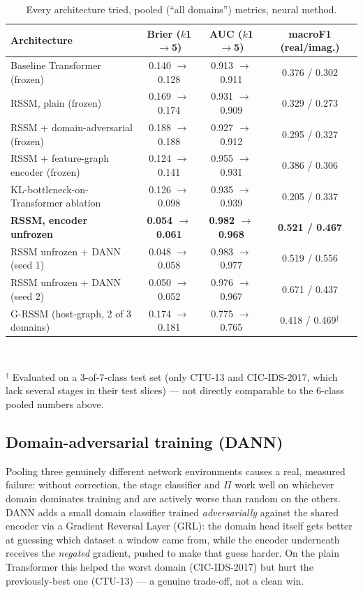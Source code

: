 \documentclass[11pt]{article}
\begin{document}
\begin{table}[htbp]
\centering
\caption{Every architecture tried, pooled (``all domains'') metrics, neural method.}
\label{tab:master}
\small
\begin{tabular}{lccc}
\toprule
\textbf{Architecture} & \textbf{Brier ($k$1$\to$5)} & \textbf{AUC ($k$1$\to$5)} & \textbf{macroF1 (real/imag.)} \\
\midrule
Baseline Transformer (frozen)        & 0.140 $\to$ 0.128 & 0.913 $\to$ 0.911 & 0.376 / 0.302 \\
RSSM, plain (frozen)                 & 0.169 $\to$ 0.174 & 0.931 $\to$ 0.909 & 0.329 / 0.273 \\
RSSM + domain-adversarial (frozen)   & 0.188 $\to$ 0.188 & 0.927 $\to$ 0.912 & 0.295 / 0.327 \\
RSSM + feature-graph encoder (frozen)& 0.124 $\to$ 0.141 & 0.955 $\to$ 0.931 & 0.386 / 0.306 \\
KL-bottleneck-on-Transformer ablation& 0.126 $\to$ 0.098 & 0.935 $\to$ 0.939 & 0.205 / 0.337 \\
\textbf{RSSM, encoder unfrozen}       & \textbf{0.054 $\to$ 0.061} & \textbf{0.982 $\to$ 0.968} & \textbf{0.521 / 0.467} \\
RSSM unfrozen + DANN (seed 1)         & 0.048 $\to$ 0.058 & 0.983 $\to$ 0.977 & 0.519 / 0.556 \\
RSSM unfrozen + DANN (seed 2)         & 0.050 $\to$ 0.052 & 0.976 $\to$ 0.967 & 0.671 / 0.437 \\
G-RSSM (host-graph, 2 of 3 domains)   & 0.174 $\to$ 0.181 & 0.775 $\to$ 0.765 & 0.418 / 0.469$^\dagger$ \\
\bottomrule
\end{tabular}
\vspace{2pt}
\\ \raggedright\footnotesize $^\dagger$ Evaluated on a 3-of-7-class test set (only CTU-13 and
CIC-IDS-2017, which lack several stages in their test slices) --- not directly comparable to the
6-class pooled numbers above.
\end{table}

\subsection{Domain-adversarial training (DANN)}

Pooling three genuinely different network environments causes a real, measured failure: without
correction, the stage classifier and $\Pi$ work well on whichever domain dominates training and
are actively worse than random on the others. DANN adds a small domain classifier trained
\emph{adversarially} against the shared encoder via a Gradient Reversal Layer (GRL): the domain
head itself gets better at guessing which dataset a window came from, while the encoder
underneath receives the \emph{negated} gradient, pushed to make that guess harder. On the plain
Transformer this helped the worst domain (CIC-IDS-2017) but hurt the previously-best one
(CTU-13) --- a genuine trade-off, not a clean win.
\end{document}
